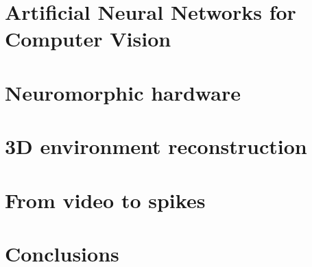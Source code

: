 \documentclass[11pt,a4paper,oneside]{memoir}
\begin{document}
\newpage\null\thispagestyle{empty}\newpage

  \chapter{Artificial Neural Networks for Computer Vision}
  \label{chp:vision}
  

\newpage\null\thispagestyle{empty}\newpage

  \chapter{Neuromorphic hardware}
  \label{chp:neuro-hw}
  

\newpage\null\thispagestyle{empty}\newpage

  \chapter{3D environment reconstruction}
  \label{chp:reconstruction}
  

\newpage\null\thispagestyle{empty}\newpage

  \chapter{From video to spikes}
  \label{chp:img2spk}
  

\newpage\null\thispagestyle{empty}\newpage

  \chapter{Conclusions}
  \label{chp:conclusions}
  

  \printbibliography
\end{document}
